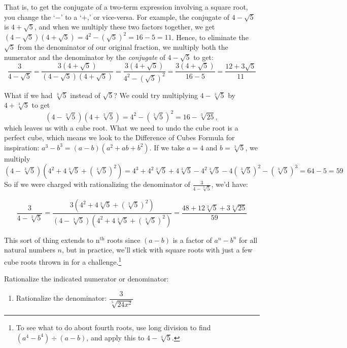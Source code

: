 \documentclass{ximera}
\begin{document}
{{{{\medskip

That is, to get the conjugate of a two-term expression involving a square root, you change the `$-$' to a `$+$,' or vice-versa.  For example, the conjugate of $4 - \sqrt{5}$ is $4 + \sqrt{5}$, and when we multiply these two factors together, we get $(4 - \sqrt{5})(4 + \sqrt{5}) = 4^2 - (\sqrt{5})^2 = 16 - 5 = 11$.  Hence, to eliminate the $\sqrt{5}$ from the denominator of our original fraction, we multiply both the numerator and the denominator by the \textit{conjugate} of $4-\sqrt{5}$ to get: \[\dfrac{3}{4 - \sqrt{5}} = \dfrac{3 (4 + \sqrt{5})}{(4 - \sqrt{5})(4 + \sqrt{5})} = \dfrac{3 (4 + \sqrt{5})}{4^2 - (\sqrt{5})^2} = \dfrac{3(4 + \sqrt{5})}{16 - 5} = \dfrac{12 + 3\sqrt{5}}{11}\] 

What if we had $\sqrt[3]{5}$ instead of $\sqrt{5}$?  We could try multiplying $4 - \sqrt[3]{5}$ by $4 + \sqrt[3]{5}$ to get  \[(4 - \sqrt[3]{5})(4 + \sqrt[3]{5}) = 4^2 - (\sqrt[3]{5})^2 = 16 - \sqrt[3]{25},\] which leaves us with a cube root.  What we need to undo the cube root is a perfect cube, which means we look to the Difference of Cubes Formula for inspiration:  $a^3 - b^3 = (a-b)(a^2+ab+b^2)$.  If we take $a = 4$ and $b = \sqrt[3]{5}$, we multiply \[ (4 - \sqrt[3]{5})(4^2 + 4\sqrt[3]{5} + (\sqrt[3]{5})^2) = 4^3 + 4^2\sqrt[3]{5} + 4 \sqrt[3]{5} - 4^2\sqrt[3]{5}-4(\sqrt[3]{5})^2 - (\sqrt[3]{5})^3 = 64 - 5 = 59\] So if we were charged with rationalizing the denominator of $\frac{3}{4 - \sqrt[3]{5}}$, we'd have:

\[ \dfrac{3}{4 - \sqrt[3]{5}} = \dfrac{3(4^2 + 4\sqrt[3]{5} + (\sqrt[3]{5})^2)}{(4 - \sqrt[3]{5})(4^2 + 4\sqrt[3]{5} + (\sqrt[3]{5})^2)} = \dfrac{48 + 12\sqrt[3]{5}+ 3\sqrt[3]{25}}{59}\]

This sort of thing extends to $\text{n}^{\text{th}}$ roots since $(a-b)$ is a factor of $a^n - b^n$ for all natural numbers $n$, but in practice, we'll stick with square roots with just a few cube roots thrown in for a challenge.\footnote{To see what to do about fourth roots, use long division to find $(a^4 - b^4) \div (a-b)$, and apply this to $4 - \sqrt[4]{5}$.}

\begin{example} \label{rationalizenumdenom} Rationalize the indicated numerator or denominator:

\begin{multicols}{2}
\begin{enumerate}

\item  Rationalize the denominator:  $\dfrac{3}{\sqrt[5]{24x^2}}$


\end{enumerate}
\end{multicols}
\end{example}}}}}
\end{document}

